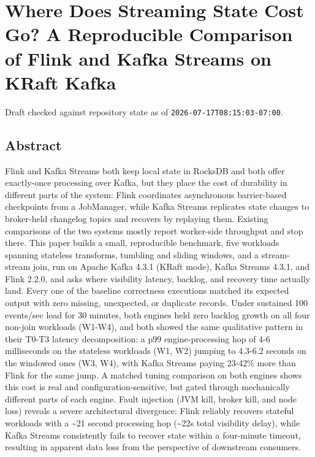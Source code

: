 \documentclass[
]{article}
\author{}
\date{}
\begin{document}
\hypertarget{where-does-streaming-state-cost-go-a-reproducible-comparison-of-flink-and-kafka-streams-on-kraft-kafka}{%
\section{Where Does Streaming State Cost Go? A Reproducible Comparison
of Flink and Kafka Streams on KRaft
Kafka}\label{where-does-streaming-state-cost-go-a-reproducible-comparison-of-flink-and-kafka-streams-on-kraft-kafka}}

Draft checked against repository state as of
\texttt{2026-07-17T08:15:03-07:00}.

\hypertarget{abstract}{%
\subsection{Abstract}\label{abstract}}

Flink and Kafka Streams both keep local state in RocksDB and both offer
exactly-once processing over Kafka, but they place the cost of
durability in different parts of the system: Flink coordinates
asynchronous barrier-based checkpoints from a JobManager, while Kafka
Streams replicates state changes to broker-held changelog topics and
recovers by replaying them. Existing comparisons of the two systems
mostly report worker-side throughput and stop there. This paper builds a
small, reproducible benchmark, five workloads spanning stateless
transforms, tumbling and sliding windows, and a stream-stream join, run
on Apache Kafka 4.3.1 (KRaft mode), Kafka Streams 4.3.1, and Flink
2.2.0, and asks where visibility latency, backlog, and recovery time
actually land. Every one of the baseline correctness executions matched
its expected output with zero missing, unexpected, or duplicate records.
Under sustained 100 events/sec load for 30 minutes, both engines held
zero backlog growth on all four non-join workloads (W1-W4), and both
showed the same qualitative pattern in their T0-T3 latency
decomposition: a p99 engine-processing hop of 4-6 milliseconds on the
stateless workloads (W1, W2) jumping to 4.3-6.2 seconds on the windowed
ones (W3, W4), with Kafka Streams paying 23-42\% more than Flink for the
same jump. A matched tuning comparison on both engines shows this cost
is real and configuration-sensitive, but gated through mechanically
different parts of each engine. Fault injection (JVM kill, broker kill,
and node loss) reveals a severe architectural divergence: Flink reliably
recovers stateful workloads with a \textasciitilde21 second processing
hop (\textasciitilde22s total visibility delay), while Kafka Streams
consistently fails to recover state within a four-minute timeout,
resulting in apparent data loss from the perspective of downstream
consumers.
\end{document}
